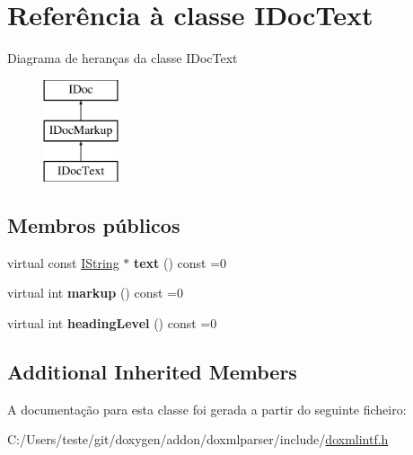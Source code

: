 \hypertarget{class_i_doc_text}{\section{Referência à classe I\-Doc\-Text}
\label{class_i_doc_text}
}
Diagrama de heranças da classe I\-Doc\-Text\begin{figure}[H]
\begin{center}
\leavevmode
\includegraphics[height=3.000000cm]{class_i_doc_text}
\end{center}
\end{figure}
\subsection*{Membros públicos}
\begin{DoxyCompactItemize}
\item 
\hypertarget{class_i_doc_text_aa487ae4b2bd6e3e7975ff2efe2666148}{virtual const \hyperlink{class_i_string}{I\-String} $\ast$ {\bfseries text} () const =0}\label{class_i_doc_text_aa487ae4b2bd6e3e7975ff2efe2666148}

\item 
\hypertarget{class_i_doc_text_a4edbcfbfc6c605d6a13e127989409892}{virtual int {\bfseries markup} () const =0}\label{class_i_doc_text_a4edbcfbfc6c605d6a13e127989409892}

\item 
\hypertarget{class_i_doc_text_af2be1503cf9bf69306401b7d8023605b}{virtual int {\bfseries heading\-Level} () const =0}\label{class_i_doc_text_af2be1503cf9bf69306401b7d8023605b}

\end{DoxyCompactItemize}
\subsection*{Additional Inherited Members}


A documentação para esta classe foi gerada a partir do seguinte ficheiro\-:\begin{DoxyCompactItemize}
\item 
C\-:/\-Users/teste/git/doxygen/addon/doxmlparser/include/\hyperlink{include_2doxmlintf_8h}{doxmlintf.\-h}\end{DoxyCompactItemize}
